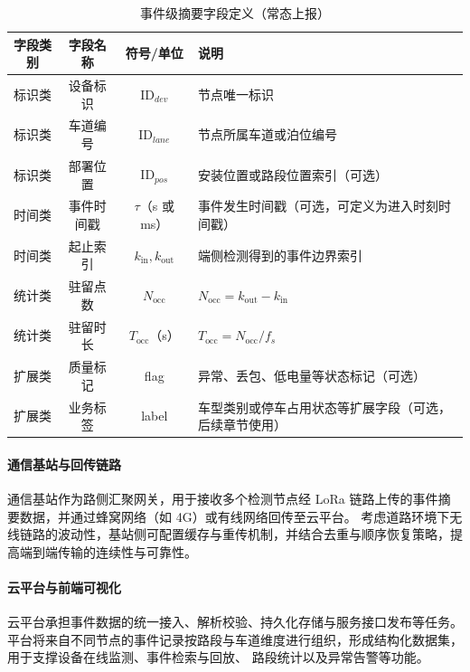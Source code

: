 \documentclass{xdupgthesis}
\begin{document}
\begin{table}[!htbp]
    \centering
    \caption{事件级摘要字段定义（常态上报）}
    \label{tab:event_summary}
    \begin{tabular}{c c c p{7.2cm}}
        \hline
        字段类别 & 字段名称 & 符号/单位 & 说明 \\
        \hline
        标识类 & 设备标识 & $\mathrm{ID}_{dev}$ & 节点唯一标识 \\
        标识类 & 车道编号 & $\mathrm{ID}_{lane}$ & 节点所属车道或泊位编号 \\
        标识类 & 部署位置 & $\mathrm{ID}_{pos}$ & 安装位置或路段位置索引（可选） \\
        \hline
        时间类 & 事件时间戳 & $\tau$（s 或 ms） & 事件发生时间戳（可选，可定义为进入时刻时间戳） \\
        时间类 & 起止索引 & $k_{\mathrm{in}}, k_{\mathrm{out}}$ & 端侧检测得到的事件边界索引 \\
        统计类 & 驻留点数 & $N_{\mathrm{occ}}$ & $N_{\mathrm{occ}} = k_{\mathrm{out}} - k_{\mathrm{in}}$ \\
        统计类 & 驻留时长 & $T_{\mathrm{occ}}$（s） & $T_{\mathrm{occ}} = N_{\mathrm{occ}}/f_s$ \\
        \hline
        扩展类 & 质量标记 & flag & 异常、丢包、低电量等状态标记（可选） \\
        扩展类 & 业务标签 & label & 车型类别或停车占用状态等扩展字段（可选，后续章节使用） \\
        \hline
    \end{tabular}
\end{table}

\paragraph{通信基站与回传链路}
通信基站作为路侧汇聚网关，用于接收多个检测节点经 LoRa 链路上传的事件摘要数据，并通过蜂窝网络（如 4G）或有线网络回传至云平台。
考虑道路环境下无线链路的波动性，基站侧可配置缓存与重传机制，并结合去重与顺序恢复策略，提高端到端传输的连续性与可靠性。

\paragraph{云平台与前端可视化}
云平台承担事件数据的统一接入、解析校验、持久化存储与服务接口发布等任务。
平台将来自不同节点的事件记录按路段与车道维度进行组织，形成结构化数据集，用于支撑设备在线监测、事件检索与回放、
路段统计以及异常告警等功能。
\end{document}
